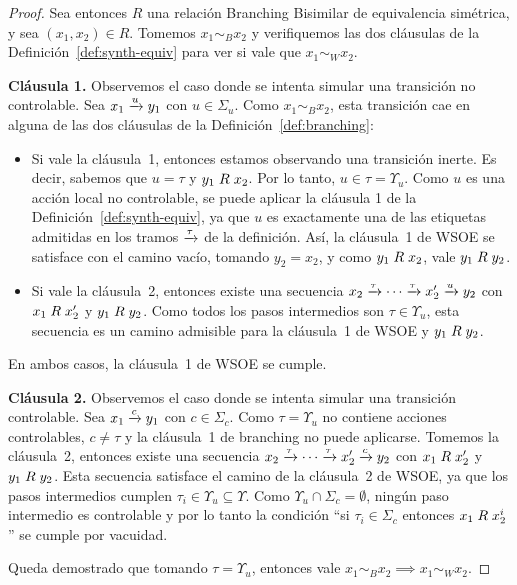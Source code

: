 \begin{proof}
Sea entonces $R$ una relación Branching Bisimilar de equivalencia simétrica, y sea $(x_1,x_2)\in R$. Tomemos $x_1 \sim_{B} x_2$ y verifiquemos las dos cláusulas de la Definición~\ref{def:synth-equiv} para ver si vale que $x_1\sim_{W}x_2$.

\medskip
\noindent\textbf{Cláusula 1.} Observemos el caso donde se intenta simular una transición no controlable. Sea $x_1\pijl{u}y_1$ con
$u\in\Sigma_u$. Como $x_1 \sim_{B} x_2$, esta transición cae en alguna de las dos cláusulas de la Definición~\ref{def:branching}:
\begin{itemize}
\item Si vale la cláusula~1, entonces estamos observando una transición inerte. Es decir, sabemos que $u=\tau$ y ${y_1 \mathrel{R} x_2}$. Por lo tanto, $u\in\tau=\Upsilon_u$. Como $u$ es una acción local no controlable, se puede aplicar la cláusula 1 de la Definición~\ref{def:synth-equiv}, ya que $u$ es exactamente una de las etiquetas admitidas en los tramos $\pijl{\tau}$ de la definición. Así, la cláusula~1 de WSOE se satisface con el camino vacío, tomando $y_2=x_2$, y como ${y_1 \mathrel{R} x_2}$, vale ${y_1 \mathrel{R} y_2}$.
\item Si vale la cláusula~2, entonces existe una secuencia
$x_2\pijl{\tau}\cdots\pijl{\tau}x_2'\pijl{u}y_2$ con ${x_1 \mathrel{R} x_2'}$ y ${y_1 \mathrel{R} y_2}$.
Como todos los pasos intermedios son $\tau\in\Upsilon_u$, esta secuencia es un camino
admisible para la cláusula~1 de WSOE y ${y_1 \mathrel{R} y_2}$.
\end{itemize}
En ambos casos, la cláusula~1 de WSOE se cumple.

\medskip
\noindent\textbf{Cláusula 2.} Observemos el caso donde se intenta simular una transición controlable. Sea $x_1\pijl{c}y_1$ con
$c\in\Sigma_c$. Como $\tau=\Upsilon_u$ no contiene acciones controlables, $c\neq\tau$ y la
cláusula~1 de branching no puede aplicarse. Tomemos la cláusula~2, entonces existe una secuencia $x_2\pijl{\tau}\cdots\pijl{\tau}x_2'\pijl{c}y_2$ con ${x_1 \mathrel{R} x_2'}$ y ${y_1 \mathrel{R} y_2}$. Esta secuencia satisface el camino de la cláusula~2 de WSOE, ya que los pasos intermedios cumplen $\tau_i\in\Upsilon_u\subseteq\Upsilon$. Como $\Upsilon_u\cap\Sigma_c=\emptyset$, ningún paso intermedio es controlable y por lo tanto la condición ``si $\tau_i\in\Sigma_c$ entonces ${x_1 \mathrel{R} x_2^i}$'' se cumple por vacuidad. 

\medskip

Queda demostrado que tomando $\tau=\Upsilon_u$, entonces vale $x_1\sim_{B}x_2 \implies x_1\sim_{W}x_2$.
\end{proof}



